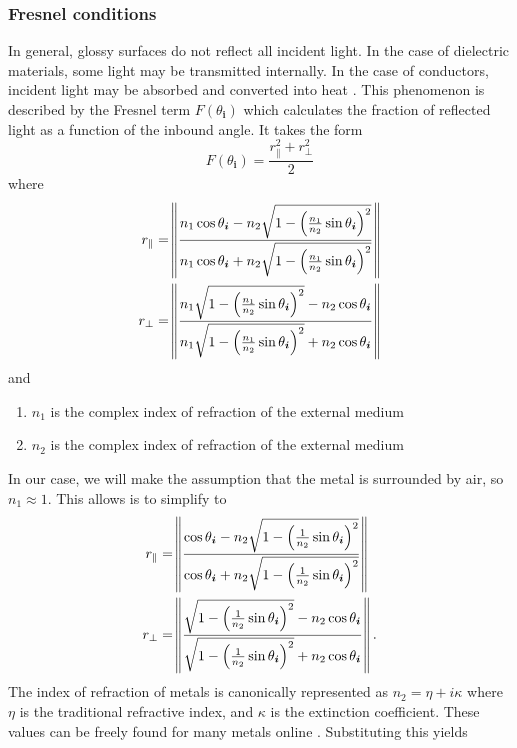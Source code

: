 \documentclass[12pt]{article}
\begin{document}
\subsubsection{Fresnel conditions}

In general, glossy surfaces do not reflect all incident light.
In the case of dielectric materials, some light may be transmitted internally.
In the case of conductors, incident light may be absorbed and converted into heat \autocite{scratchapixel_2014}.
This phenomenon is described by the Fresnel term \(F(\theta_{\bm i})\) which calculates the fraction of reflected light as a function of the inbound angle.
It takes the form \autocite{Pharr:2010:PBR:1854996}
\[F(\theta_{\bm i}) = \frac{r_{\parallel}^2 + r_{\perp}^2}{2}\]
where
\begin{align*}
  r_{\parallel} &= \norm{\frac{n_1 \cos \theta_{\bm i} - n_2 \sqrt{1 - \del{\frac{n_1}{n_2}\sin \theta_{\bm i}}^2}}{n_1 \cos \theta_{\bm i} + n_2 \sqrt{1 - \del{\frac{n_1}{n_2}\sin \theta_{\bm i}}^2}}}\\
  r_{\perp} &= \norm{\frac{n_1 \sqrt{1 - \del{\frac{n_1}{n_2}\sin \theta_{\bm i}}^2} - n_2\cos \theta_{\bm i}}{n_1 \sqrt{1 - \del{\frac{n_1}{n_2}\sin \theta_{\bm i}}^2} + n_2 \cos \theta_{\bm i}}}
\end{align*}
and
\begin{enumerate}
\item \(n_1\) is the complex index of refraction of the external medium
\item \(n_2\) is the complex index of refraction of the external medium
\end{enumerate}
In our case, we will make the assumption that the metal is surrounded by air, so \(n_1 \approx 1\).
This allows is to simplify to
\begin{align*}
  r_{\parallel} &= \norm{\frac{\cos \theta_{\bm i} - n_2 \sqrt{1 - \del{\frac{1}{n_2}\sin \theta_{\bm i}}^2}}{\cos \theta_{\bm i} + n_2 \sqrt{1 - \del{\frac{1}{n_2}\sin \theta_{\bm i}}^2}}}\\
  r_{\perp} &= \norm{\frac{\sqrt{1 - \del{\frac{1}{n_2}\sin \theta_{\bm i}}^2} - n_2\cos \theta_{\bm i}}{\sqrt{1 - \del{\frac{1}{n_2}\sin \theta_{\bm i}}^2} + n_2 \cos \theta_{\bm i}}}.
\end{align*}
The index of refraction of metals is canonically represented as \(n_2 = \eta + i\kappa\) where \(\eta\) is the traditional refractive index, and \(\kappa\) is the extinction coefficient.
These values can be freely found for many metals online \autocite{rii}.
Substituting this yields
\end{document}
